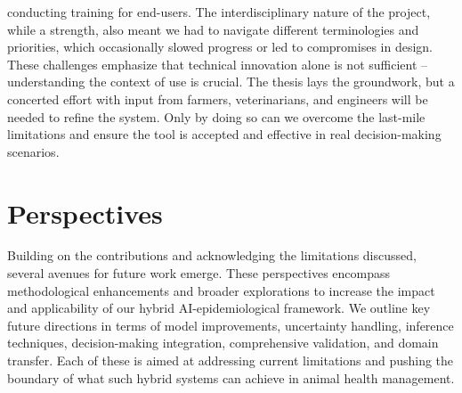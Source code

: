 conducting training for end-users. The interdisciplinary nature of the project, while a strength, also meant we had to navigate different terminologies and priorities, which occasionally slowed progress or led to compromises in design. These challenges emphasize that technical innovation alone is not sufficient – understanding the context of use is crucial. The thesis lays the groundwork, but a concerted effort with input from farmers, veterinarians, and engineers will be needed to refine the system. Only by doing so can we overcome the last-mile limitations and ensure the tool is accepted and effective in real decision-making scenarios.



\section{Perspectives}

Building on the contributions and acknowledging the limitations discussed, several avenues for future work emerge. These perspectives encompass methodological enhancements and broader explorations to increase the impact and applicability of our hybrid AI-epidemiological framework. We outline key future directions in terms of model improvements, uncertainty handling, inference techniques, decision-making integration, comprehensive validation, and domain transfer. Each of these is aimed at addressing current limitations and pushing the boundary of what such hybrid systems can achieve in animal health management.


